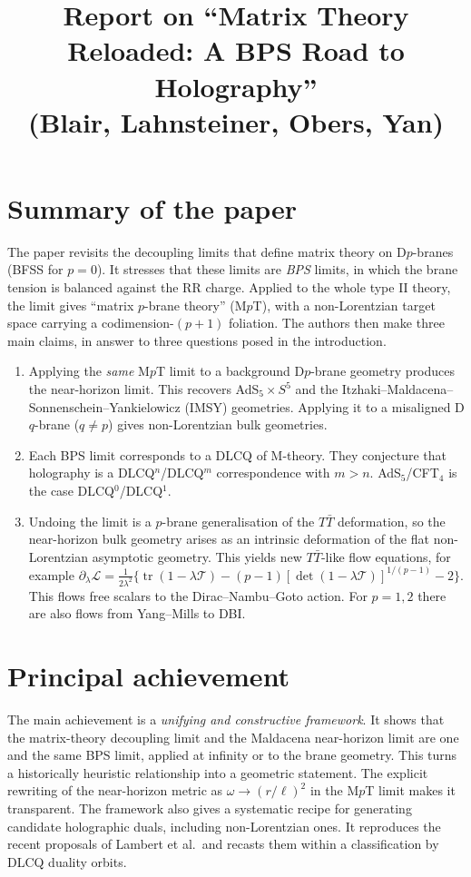 \documentclass[11pt]{article}
\title{Report on ``Matrix Theory Reloaded: A BPS Road to Holography''\\[2pt]
\large (Blair, Lahnsteiner, Obers, Yan)}
\date{}
\newcommand{\TTbar}{T\bar{T}}
\begin{document}
\maketitle

\section*{Summary of the paper}

The paper revisits the decoupling limits that define matrix theory on D$p$-branes (BFSS for $p=0$).
It stresses that these limits are \emph{BPS} limits, in which the brane tension is balanced against the RR charge.
Applied to the whole type II theory, the limit gives ``matrix $p$-brane theory'' (M$p$T), with a non-Lorentzian target space carrying a codimension-$(p+1)$ foliation.
The authors then make three main claims, in answer to three questions posed in the introduction.
\begin{enumerate}
\item Applying the \emph{same} M$p$T limit to a background D$p$-brane geometry produces the near-horizon limit. This recovers AdS$_5\times S^5$ and the Itzhaki--Maldacena--Sonnenschein--Yankielowicz (IMSY) geometries. Applying it to a misaligned D$q$-brane ($q\neq p$) gives non-Lorentzian bulk geometries.
\item Each BPS limit corresponds to a DLCQ of M-theory. They conjecture that holography is a DLCQ$^n$/DLCQ$^m$ correspondence with $m>n$. AdS$_5$/CFT$_4$ is the case DLCQ$^0$/DLCQ$^1$.
\item Undoing the limit is a $p$-brane generalisation of the $\TTbar$ deformation, so the near-horizon bulk geometry arises as an intrinsic deformation of the flat non-Lorentzian asymptotic geometry. This yields new $\TTbar$-like flow equations, for example
$\partial_\lambda\mathcal L=\tfrac{1}{2\lambda^2}\{\operatorname{tr}(1-\lambda\mathcal T)-(p-1)[\det(1-\lambda\mathcal T)]^{1/(p-1)}-2\}$.
This flows free scalars to the Dirac--Nambu--Goto action. For $p=1,2$ there are also flows from Yang--Mills to DBI.
\end{enumerate}

\section{Principal achievement}

The main achievement is a \emph{unifying and constructive framework}. It shows that the matrix-theory decoupling limit and the Maldacena near-horizon limit are one and the same BPS limit, applied at infinity or to the brane geometry.
This turns a historically heuristic relationship into a geometric statement. The explicit rewriting of the near-horizon metric as $\omega\to(r/\ell)^2$ in the M$p$T limit makes it transparent.
The framework also gives a systematic recipe for generating candidate holographic duals, including non-Lorentzian ones. It reproduces the recent proposals of Lambert et al.\ and recasts them within a classification by DLCQ duality orbits.
\end{document}
